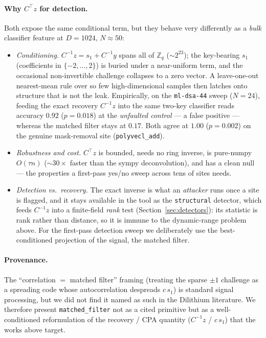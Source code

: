 \documentclass[11pt]{article}
\newcommand{\code}[1]{\texttt{#1}}
\newcommand{\Zq}{\ensuremath{\mathbb{Z}_q}}
\begin{document}
\paragraph{Why $C^{\top} z$ for detection.} Both expose the same conditional term,
but they behave very differently as a \emph{bulk} classifier feature at $D=1024$,
$N\!\approx\!50$:
\begin{itemize}[nosep]
\item \emph{Conditioning.} $C^{-1}z = s_1 + C^{-1}y$ spans all of $\Zq$
($\sim 2^{23}$); the key-bearing $s_1$ (coefficients in $\{-2,\dots,2\}$) is buried
under a near-uniform term, and the occasional non-invertible challenge collapses to
a zero vector. A leave-one-out nearest-mean rule over so few high-dimensional
samples then latches onto structure that is not the leak. Empirically, on the
\code{ml-dsa-44} sweep ($N=24$), feeding the exact recovery $C^{-1}z$ into the same
two-key classifier reads accuracy $0.92$ ($p=0.018$) at the \emph{unfaulted control}
--- a false positive --- whereas the matched filter stays at $0.17$. Both agree at
$1.00$ ($p=0.002$) on the genuine mask-removal site (\code{polyvecl\_add}).
\item \emph{Robustness and cost.} $C^{\top}z$ is bounded, needs no ring inverse, is
pure-numpy $O(\tau n)$ (${\sim}30\times$ faster than the sympy deconvolution), and
has a clean null --- the properties a first-pass yes/no sweep across tens of sites
needs.
\item \emph{Detection vs.\ recovery.} The exact inverse is what an \emph{attacker}
runs once a site is flagged, and it stays available in the tool as the
\code{structural} detector, which feeds $C^{-1}z$ into a finite-field \emph{rank}
test (Section~\ref{sec:detectors}): its statistic is rank rather than distance, so
it is immune to the dynamic-range problem above. For the first-pass detection sweep
we deliberately use the best-conditioned projection of the signal, the matched
filter.
\end{itemize}

\paragraph{Provenance.} The ``correlation $=$ matched filter'' framing (treating the
sparse $\pm1$ challenge as a spreading code whose autocorrelation despreads $c\,s_1$)
is standard signal processing, but we did not find it named as such in the Dilithium
literature. We therefore present \code{matched\_filter} not as a cited primitive but
as a well-conditioned reformulation of the recovery / CPA quantity ($C^{-1}z$ /
$c\,s_1$) that the works above target.
\end{document}
